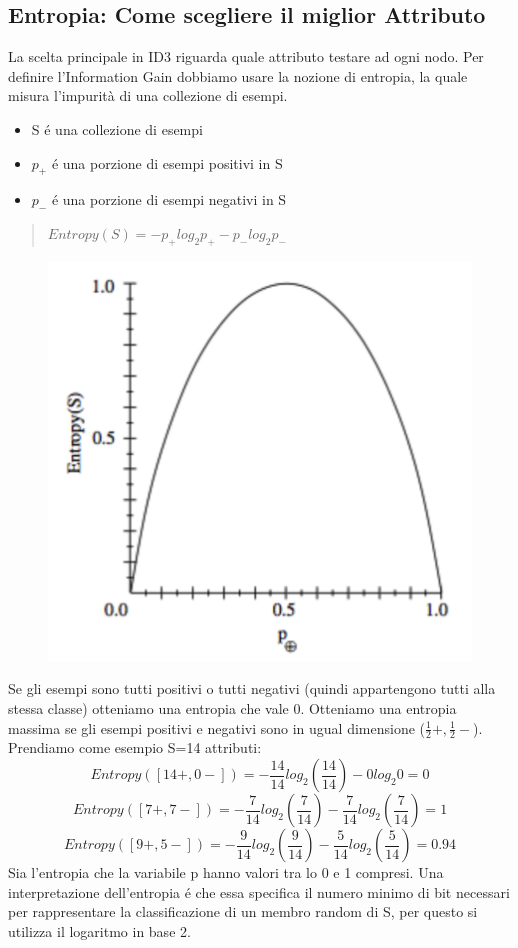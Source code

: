 \documentclass{article}
\begin{document}
\subsection{Entropia: Come scegliere il miglior Attributo}
La scelta principale in ID3 riguarda quale attributo testare ad ogni nodo. Per definire l'Information Gain dobbiamo usare la nozione di entropia, la quale misura l'impurità di una collezione di esempi.
\begin{itemize}
    \item S é una collezione di esempi
    \item $p_+$ é una porzione di esempi positivi in S
    \item $p_-$ é una porzione di esempi negativi in S
\end{itemize}
\begin{quote}
    $Entropy(S)=-p_+ log_2 p_+ -p_- log_2 p_-$
\end{quote}
\begin{figure}[H]
\centering
\includegraphics[scale=0.5]{Images/entropygraph.png}
\end{figure}
Se gli esempi sono tutti positivi o tutti negativi (quindi appartengono tutti alla stessa classe) otteniamo una entropia che vale 0. Otteniamo una entropia massima se gli esempi positivi e negativi sono in ugual dimensione ($\frac{1}{2}+,\frac{1}{2}-$). \newline 
Prendiamo come esempio S=14 attributi:
\[Entropy([14+,0-])=-\frac{14}{14}log_2(\frac{14}{14}) - 0 log_2 0 = 0\]
\[Entropy([7+,7-])=-\frac{7}{14}log_2(\frac{7}{14}) - \frac{7}{14}log_2(\frac{7}{14}) = 1\]
\[Entropy([9+,5-])=-\frac{9}{14}log_2(\frac{9}{14}) - \frac{5}{14}log_2(\frac{5}{14}) = 0.94\]
Sia l'entropia che la variabile p hanno valori tra lo 0 e 1 compresi. Una interpretazione dell'entropia é che essa specifica il numero minimo di bit necessari per rappresentare la classificazione di un membro random di S, per questo si utilizza il logaritmo in base 2.
\end{document}
